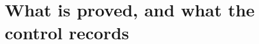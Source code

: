 \label{fin:ch:final}

\section{What is proved, and what the control records}\label{fin:sec:proved}

